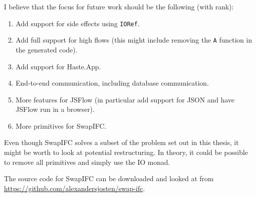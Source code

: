 I believe that the focus for future work should be the following (with rank):
\begin{enumerate}
  \item Add support for side effects using {\tt IORef}.
  \item Add full support for high flows (this might include removing the {\tt A} function in the generated code).
  \item Add support for Haste.App.
  \item End-to-end communication, including database communication.
  \item More features for JSFlow (in particular add support for JSON and have JSFlow run in a browser).
  \item More primitives for SwapIFC.
\end{enumerate}
Even though SwapIFC solves a subset of the problem set out in this thesis, it might be worth to look at potential restructuring. In theory, it could be possible to remove all primitives and simply use the IO monad.

The source code for SwapIFC can be downloaded and looked at from \url{https://github.com/alexandersjosten/swap-ifc}.
